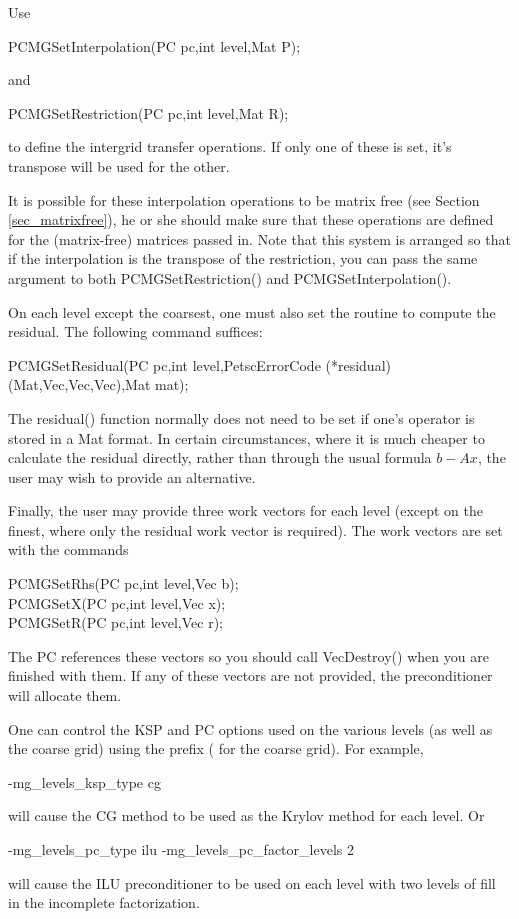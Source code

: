 Use
\begin{tabbing}
  PCMGSetInterpolation(PC pc,int level,Mat P);
\end{tabbing}
and
\begin{tabbing}
  PCMGSetRestriction(PC pc,int level,Mat R);
\end{tabbing}
to define the intergrid transfer operations.  If only one of these is
set, it's transpose will be used for the other.

It is possible for these interpolation operations to be matrix free
(see Section \ref{sec_matrixfree}),
he or she should make sure that these operations are defined for the (matrix-free) matrices
passed in.
Note that this system is arranged so that if the interpolation is
the transpose of the restriction, you can pass the same 
argument to both PCMGSetRestriction() and PCMGSetInterpolation().

On each level except the coarsest, one must also set the routine to
compute the residual.  The following command suffices:
\begin{tabbing}
   PCMGSetResidual(PC pc,int level,PetscErrorCode (*residual)(Mat,Vec,Vec,Vec),Mat mat);
\end{tabbing}
The residual() function normally does not need to be set if
one's operator is stored in a Mat format.  In certain circumstances,
where it is much cheaper to calculate the residual directly, rather
than through the usual formula $b - Ax$,  the user may wish to provide
an alternative.

Finally, the user may provide three work vectors for each level
(except on the finest, where only the residual work vector is required).
The work vectors are set with the
commands
\begin{tabbing}
  PCMGSetRhs(PC pc,int level,Vec b);\\
  PCMGSetX(PC pc,int level,Vec x);\\
  PCMGSetR(PC pc,int level,Vec r);
\end{tabbing}
The PC references these vectors so you should call VecDestroy()
when you are finished with them.  If any of these vectors are not
provided, the preconditioner will allocate them.

One can control the KSP and PC options used on the various levels
(as well as the coarse grid) using the prefix 
( for the coarse grid).
 For example,
\begin{tabbing}
  -mg\_levels\_ksp\_type cg
\end{tabbing}
will cause the CG method to be used as the Krylov method for each level.
Or
\begin{tabbing}
  -mg\_levels\_pc\_type ilu -mg\_levels\_pc\_factor\_levels 2
\end{tabbing}
will cause the ILU preconditioner to be used on each level with
two levels of fill in the incomplete factorization.

